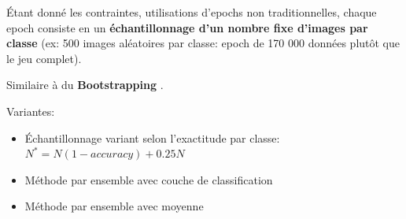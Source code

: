 Étant donné les contraintes, utilisations d'epochs non traditionnelles, chaque epoch consiste en un \textbf{échantillonnage d'un nombre fixe d'images par classe} (ex: 500 images aléatoires par classe: epoch de 170 000 données plutôt que le jeu complet).

Similaire à du \textbf{Bootstrapping} .


Variantes:

\begin{itemize}
\item Échantillonnage variant selon l'exactitude par classe: $N^*=N(1-accuracy) +0.25N$
\item Méthode par ensemble avec couche de classification
\item Méthode par ensemble avec moyenne
\end{itemize}